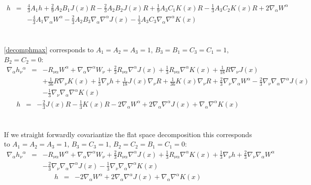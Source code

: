 \documentclass[10pt,letterpaper]{article}
\numberwithin{equation}{section}
\begin{document}
\begin{eqnarray}
h&=& \tfrac{4}{3} A_{1}{} h + \tfrac{2}{9} A_{2}{} B_{1}{} J(x) R -  \tfrac{2}{3} A_{2}{} B_{2}{} J(x) R + \tfrac{1}{9} A_{3}{} C_{1}{} K(x) R -  \tfrac{1}{3} A_{3}{} C_{2}{} K(x) R + 2 \nabla_{\alpha }W^{\alpha } \nonumber \\ 
&& -  \tfrac{4}{3} A_{1}{} \nabla_{\alpha }W^{\alpha } -  \tfrac{2}{3} A_{2}{} B_{3}{} \nabla_{\alpha }\nabla^{\alpha }J(x) -  \tfrac{1}{3} A_{3}{} C_{3}{} \nabla_{\alpha }\nabla^{\alpha }K(x)
\end{eqnarray}
%
%
\\ \\
\eqref{decomphmax} corresponds to $A_1=A_2=A_3=1$, $B_3=B_1=C_3=C_1=1$, $B_2=C_2=0$:
\begin{eqnarray}
  \nabla_{\alpha }h_{\nu }{}^{\alpha }&=& - R_{\nu \alpha } W^{\alpha }  + \nabla_{\alpha }\nabla^{\alpha }W_{\nu } + \tfrac{2}{3} R_{\nu \alpha } \nabla^{\alpha }J(x) + \tfrac{1}{3} R_{\nu \alpha } \nabla^{\alpha }K(x) + \tfrac{1}{18} R \nabla_{\nu }J(x) \nonumber \\ 
&& + \tfrac{1}{36} R \nabla_{\nu }K(x) + \tfrac{1}{3} \nabla_{\nu }h + \tfrac{1}{18} J(x) \nabla_{\nu }R + \tfrac{1}{36} K(x) \nabla_{\nu }R + \tfrac{2}{3} \nabla_{\nu }\nabla_{\alpha }W^{\alpha } -  \tfrac{2}{3} \nabla_{\nu }\nabla_{\alpha }\nabla^{\alpha }J(x) \nonumber \\ 
&& -  \tfrac{1}{3} \nabla_{\nu }\nabla_{\alpha }\nabla^{\alpha }K(x)
\end{eqnarray}
\begin{eqnarray}
h&=& -  \tfrac{2}{3} J(x) R -  \tfrac{1}{3} K(x) R - 2 \nabla_{\alpha }W^{\alpha } + 2 \nabla_{\alpha }\nabla^{\alpha }J(x) + \nabla_{\alpha }\nabla^{\alpha }K(x)
\end{eqnarray}
\\ \\
If we straight forwardly covariantize the flat space decomposition this corresponds to $A_1=A_2=A_3=1$, $B_3=C_3=1$, $B_2=C_2=B_1=C_1=0$:
\begin{eqnarray}
 \nabla_{\alpha }h_{\nu }{}^{\alpha } &=& - R_{\nu \alpha } W^{\alpha }+ \nabla_{\alpha }\nabla^{\alpha }W_{\nu } + \tfrac{2}{3} R_{\nu \alpha } \nabla^{\alpha }J(x) + \tfrac{1}{3} R_{\nu \alpha } \nabla^{\alpha }K(x) + \tfrac{1}{3} \nabla_{\nu }h + \tfrac{2}{3} \nabla_{\nu }\nabla_{\alpha }W^{\alpha } \nonumber \\ 
&& -  \tfrac{2}{3} \nabla_{\nu }\nabla_{\alpha }\nabla^{\alpha }J(x) -  \tfrac{1}{3} \nabla_{\nu }\nabla_{\alpha }\nabla^{\alpha }K(x)
\end{eqnarray}
\begin{eqnarray}
h&=& - 2 \nabla_{\alpha }W^{\alpha } + 2 \nabla_{\alpha }\nabla^{\alpha }J(x) + \nabla_{\alpha }\nabla^{\alpha }K(x)
\end{eqnarray}
\end{document}
